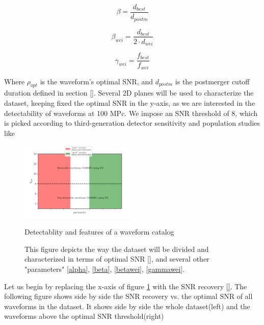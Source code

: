 \begin{equation}\label{beta}
\beta = \frac{d_{best}}{d_{postm}}
\end{equation}

\begin{equation}\label{betawei}
\beta_{wei} = \frac{d_{best}}{2\cdot d_{wei}}
\end{equation}

\begin{equation}\label{gammawei}
\gamma_{wei} = \frac{f_{best}}{f_{wei}}
\end{equation}

Where $\rho_{opt}$ is the waveform's optimal SNR, and $d_{postm}$ is the postmerger cutoff duration defined in section \ref{}. Several 2D planes will be used to characterize the dataset, keeping fixed the optimal SNR in the y-axis, as we are interested in the detectability of waveforms at 100 MPc. We impose an SNR  threshold of 8, which is picked according to third-generation detector sensitivity and population studies like \cite[section 3]{https://doi.org/10.48550/arxiv.2109.09882}


\begin{figure}[hbt!]
\begin{center}
\includegraphics[width=0.5\textwidth, angle=0]{images/Data_analysis/results/schematics.pdf}
\captionsetup{width=0.8\textwidth}
\caption{Detectablity and features of a waveform catalog}
\caption*{This figure depicts the way the dataset will be divided and characterized in terms of optimal SNR \ref{}, and several other "parameters" \ref{alpha}, \ref{beta}, \ref{betawei}, \ref{gammawei}.}
\label{regions}
\end{center} 
\end{figure}

\FloatBarrier

Let us begin by replacing the x-axis of figure \ref{regions} with the SNR recovery \ref{}. The following figure shows side by side the SNR recovery vs. the optimal SNR of all waveforms in the dataset. It shows side by side the whole dataset(left) and the waveforms above the optimal SNR threshold(right)


